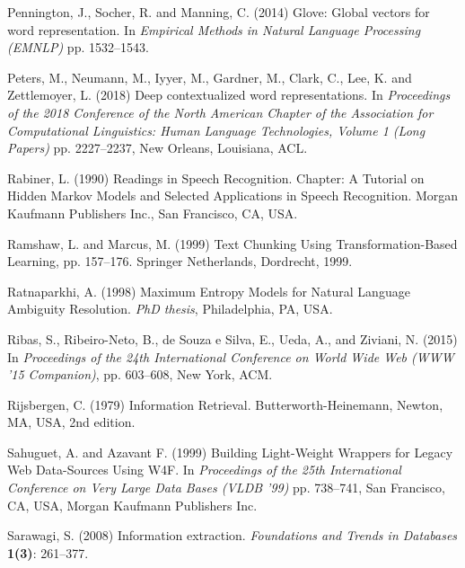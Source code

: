 \documentclass{nle}
\begin{document}
\begin{thebibliography}{}
Pennington, J., Socher, R. and Manning, C. (2014)
Glove: Global vectors for word representation.
In {\it Empirical Methods in Natural Language Processing (EMNLP)}
pp. 1532--1543.

Peters, M., Neumann, M., Iyyer, M., Gardner, M., Clark, C., Lee, K. and Zettlemoyer, L. (2018)
Deep contextualized word representations.
In {\it Proceedings of the 2018 Conference of the North American Chapter of the Association for Computational Linguistics: Human Language Technologies, Volume 1 (Long Papers)}
pp. 2227--2237, New Orleans, Louisiana, ACL.

Rabiner, L. (1990)
Readings in Speech Recognition. Chapter: A Tutorial on Hidden Markov Models and Selected Applications in Speech Recognition.
Morgan Kaufmann Publishers Inc., San Francisco, CA, USA.

Ramshaw, L. and Marcus, M. (1999)
Text Chunking Using Transformation-Based Learning, 
pp. 157--176. Springer Netherlands, Dordrecht, 1999.

Ratnaparkhi, A. (1998)
Maximum Entropy Models for Natural Language Ambiguity Resolution.
{\it PhD thesis}, Philadelphia, PA, USA.

Ribas, S., Ribeiro-Neto, B., de Souza e Silva, E., Ueda, A., and Ziviani, N. (2015)
In {\it Proceedings of the 24th International Conference on World Wide Web (WWW '15 Companion)}, 
pp. 603--608, New York, ACM.

Rijsbergen, C. (1979)
Information Retrieval.
Butterworth-Heinemann, Newton, MA, USA, 2nd edition.

Sahuguet, A. and Azavant F. (1999)
Building Light-Weight Wrappers for Legacy Web Data-Sources Using W4F.
In {\it Proceedings of the 25th International Conference on Very Large Data Bases (VLDB '99)}
pp. 738--741, San Francisco, CA, USA, Morgan Kaufmann Publishers Inc.

Sarawagi, S. (2008)
Information extraction.
{\it Foundations and Trends in Databases}
{\bf 1(3)}: 261--377.


\end{thebibliography}
\end{document}
